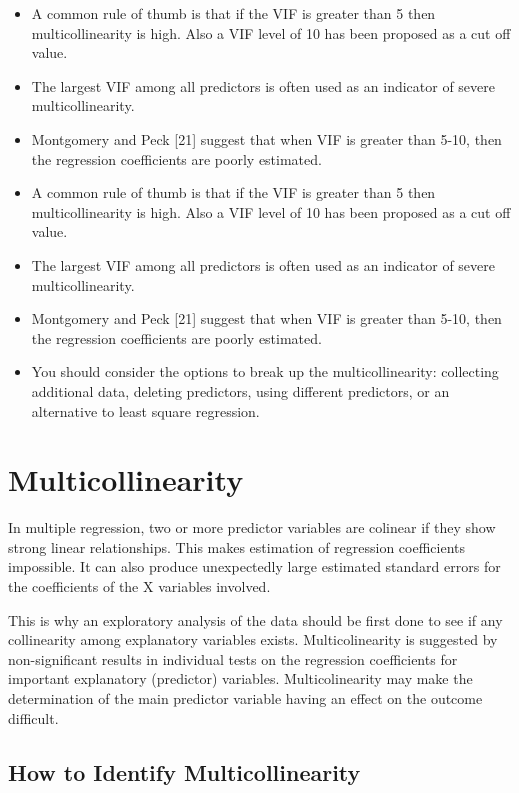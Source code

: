 \documentclass[a4paper,12pt]{article}
\begin{document}
\begin{itemize}
\item  A common rule of thumb is that if the VIF is greater than 5 then multicollinearity is high. Also a VIF
level of 10 has been proposed as a cut off value.
\item  The largest VIF among all predictors is often used as an indicator of severe multicollinearity.
\item  Montgomery and Peck [21] suggest that when VIF is greater than 5-10, then the regression coefficients are poorly estimated.
\item A common rule of thumb is that if the VIF is greater than 5 then multicollinearity is high.
Also a VIF level of 10 has been proposed as a cut off value.
\item The largest VIF among all predictors is often used as an indicator of severe multicollinearity. 
\item Montgomery and Peck [21] suggest that when VIF is greater than 5-10, then the regression coefficients are poorly estimated. \item You should
consider the options to break up the multicollinearity: collecting additional data, deleting
predictors, using different predictors, or an alternative to least square regression.
\end{itemize}







\newpage
\section{Multicollinearity}
In multiple regression, two or more predictor variables are colinear if they show strong linear relationships. This makes estimation of regression coefficients impossible. It can also produce unexpectedly large estimated standard errors for the coefficients of the X variables involved.

This is why an exploratory analysis of the data should be first done to see if any collinearity among explanatory variables exists. Multicolinearity is suggested by non-significant results in individual tests on the regression coefficients for important explanatory (predictor) variables. Multicolinearity may make the determination of the main predictor variable having an effect on the outcome difficult.

\subsection{How to Identify Multicollinearity}
\end{document}
